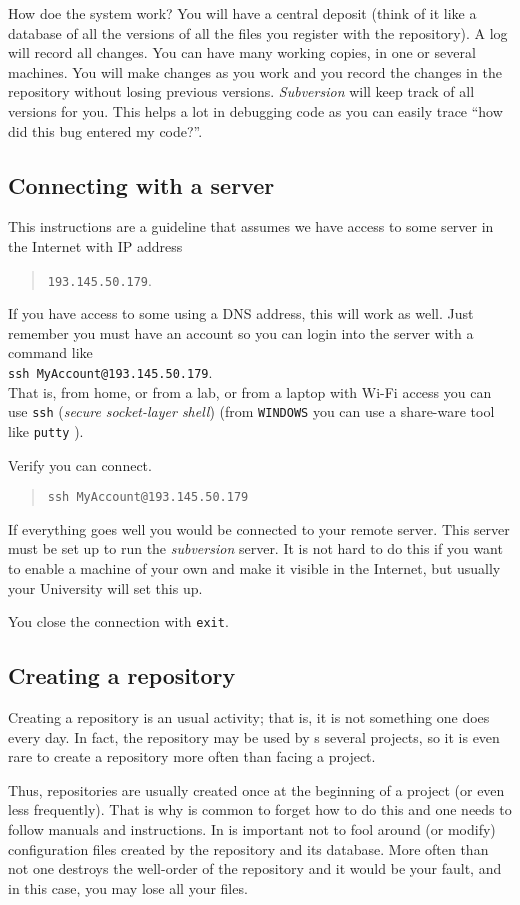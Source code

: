 \documentclass[article,12pt]{article}
\begin{document}
How doe the system work?
You will have a central deposit (think of it like a database of all
the versions of all the files you register with the repository).
A log will record all changes.
You can have many working copies, in one or several machines.
You will make changes as you work and you record the changes
in the repository without losing previous versions.
{\em Subversion} will keep track of all versions for you.
This helps a lot in debugging code as you can easily trace
``how did this bug entered my code?''.

\subsection*{Connecting with a server}
This instructions are a guideline that assumes we have access to some
server in the Internet with IP address
\begin{quote}
{\tt 193.145.50.179}.
\end{quote}
If you have access to some using a DNS address, this will work as well.
Just remember you must have an account so you can login into the
server with a command like\\
{\tt ssh MyAccount@193.145.50.179}.\\
That is, from home, or from a lab, or from a laptop with Wi-Fi access
you can use
{\tt ssh} ({\em secure socket-layer shell}) (from  {\tt WINDOWS}
you can use a share-ware tool like {\tt putty} ).

Verify you can connect.
\begin{quote}
{\tt ssh MyAccount@193.145.50.179}
\end{quote}
If everything goes well you would be connected to your remote
server. This server must be set up to run the {\em subversion} server.
It is not hard to do this if you want to enable a machine of your own
and make it visible in the Internet, but usually your University will
set this up.

You close the connection with {\tt exit}.
\subsection*{ Creating a repository}
Creating a repository is an usual activity; that is, it is not
something one does every day. In fact, the repository
may be used by s several projects, so it is even rare to create 
a repository more often than facing a project.

Thus, repositories are usually created once at the beginning of
a project (or even less frequently).
That is why is common to forget how to do this
and one needs to follow manuals and instructions.
In is important not to fool around (or modify)
configuration files created by the repository and its database.
More often than not one destroys the well-order of the repository
and it would be your fault, and in this  case, you may lose
all your files.
\end{document}
